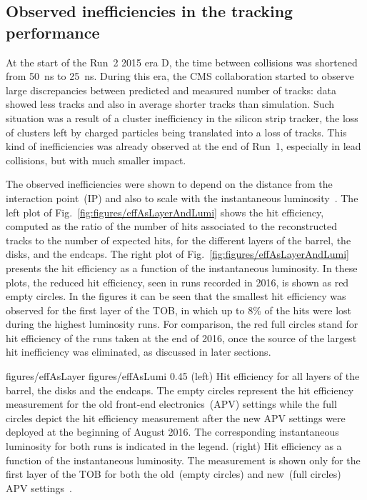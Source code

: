 \subsection{Observed inefficiencies in the tracking performance}

At the start of the Run~2 2015 era D, the time between collisions was shortened from 50~ns to 25~ns. During this era, the CMS collaboration started to observe large discrepancies between predicted and measured number of tracks: data showed less tracks and also in average shorter tracks than simulation. Such situation was a result of a cluster inefficiency in the silicon strip tracker, the loss of clusters left by charged particles being translated into a loss of tracks. This kind of inefficiencies was already observed at the end of Run~1, especially in lead collisions, but with much smaller impact. 

The observed inefficiencies were shown to depend on the distance from the interaction point~(IP) and also to scale with the instantaneous luminosity~\cite{website:hitEff}. The left plot of Fig.~\ref{fig:figures/effAsLayerAndLumi} shows the hit efficiency, computed as the ratio of the number of hits associated to the reconstructed tracks to the number of expected hits, for the different layers of the barrel, the disks, and the endcaps. The right plot of Fig.~\ref{fig:figures/effAsLayerAndLumi} presents the hit efficiency as a function of the instantaneous luminosity. In these plots, the reduced hit efficiency, seen in runs recorded in 2016, is shown as red empty circles. In the figures it can be seen that the smallest hit efficiency was observed for the first layer of the TOB, in which up to 8\% of the hits were lost during the highest luminosity runs. For comparison, the red full circles stand for hit efficiency of the runs taken at the end of 2016, once the source of the largest hit inefficiency was eliminated, as discussed in later sections.


                 {figures/effAsLayer}
                 {figures/effAsLumi} %
                 {0.45}       %
                 {(left) Hit efficiency for all layers of the barrel, the disks and the endcaps. The empty circles represent the hit efficiency measurement for the old front-end electronics~(APV) settings while the full circles depict the hit efficiency measurement after the new APV settings were deployed at the beginning of August 2016. The corresponding instantaneous luminosity for both runs is indicated in the legend. (right) Hit efficiency as a function of the instantaneous luminosity. The measurement is shown only for the first layer of the TOB for both the old~(empty circles) and new~(full circles) APV settings~\cite{website:hitEff}. } %



